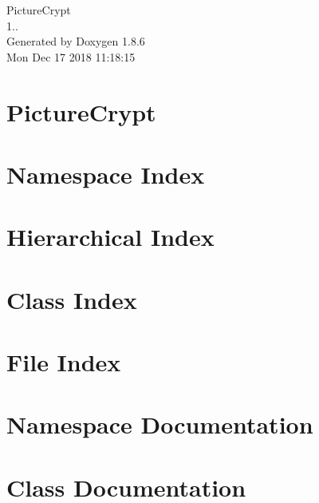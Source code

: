 \documentclass[twoside]{book}
\newcommand{\clearemptydoublepage}{%
  \newpage{\pagestyle{empty}\cleardoublepage}%
}
\begin{document}
\hypersetup{pageanchor=false}
\begin{titlepage}
\vspace*{7cm}
\begin{center}%
{\Large Picture\-Crypt \\[1ex]\large 1.. }\\
\vspace*{1cm}
{\large Generated by Doxygen 1.8.6}\\
\vspace*{0.5cm}
{\small Mon Dec 17 2018 11:18:15}\\
\end{center}
\end{titlepage}
\clearemptydoublepage
\tableofcontents
\clearemptydoublepage
{}
\hypersetup{pageanchor=true}

\chapter{Picture\-Crypt}
\label{index}\hypertarget{index}{}
\chapter{Namespace Index}

\chapter{Hierarchical Index}

\chapter{Class Index}

\chapter{File Index}

\chapter{Namespace Documentation}



\chapter{Class Documentation}







\end{document}
